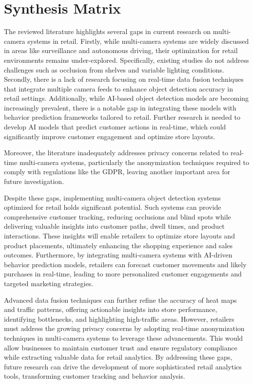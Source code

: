 {\section{Synthesis Matrix}
The reviewed literature highlights several gaps in current research on multi-camera systems in retail. Firstly, while multi-camera systems are widely discussed in areas like surveillance and autonomous driving, their optimization for retail environments remains under-explored. Specifically, existing studies do not address challenges such as occlusion from shelves and variable lighting conditions. Secondly, there is a lack of research focusing on real-time data fusion techniques that integrate multiple camera feeds to enhance object detection accuracy in retail settings. Additionally, while AI-based object detection models are becoming increasingly prevalent, there is a notable gap in integrating these models with behavior prediction frameworks tailored to retail. Further research is needed to develop AI models that predict customer actions in real-time, which could significantly improve customer engagement and optimize store layouts.

Moreover, the literature inadequately addresses privacy concerns related to real-time multi-camera systems, particularly the anonymization techniques required to comply with regulations like the GDPR, leaving another important area for future investigation.

Despite these gaps, implementing multi-camera object detection systems optimized for retail holds significant potential. Such systems can provide comprehensive customer tracking, reducing occlusions and blind spots while delivering valuable insights into customer paths, dwell times, and product interactions. These insights will enable retailers to optimize store layouts and product placements, ultimately enhancing the shopping experience and sales outcomes. Furthermore, by integrating multi-camera systems with AI-driven behavior prediction models, retailers can forecast customer movements and likely purchases in real-time, leading to more personalized customer engagements and targeted marketing strategies.

Advanced data fusion techniques can further refine the accuracy of heat maps and traffic patterns, offering actionable insights into store performance, identifying bottlenecks, and highlighting high-traffic areas. However, retailers must address the growing privacy concerns by adopting real-time anonymization techniques in multi-camera systems to leverage these advancements. This would allow businesses to maintain customer trust and ensure regulatory compliance while extracting valuable data for retail analytics. By addressing these gaps, future research can drive the development of more sophisticated retail analytics tools, transforming customer tracking and behavior analysis.

}
